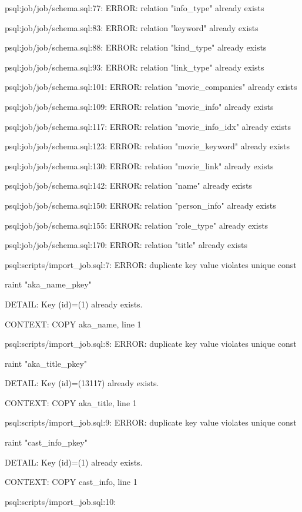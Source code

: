 \documentclass[11pt,a4paper]{article}
\begin{document}
psql:job/job/schema.sql:77: ERROR:  relation "info\_type" already exists

psql:job/job/schema.sql:83: ERROR:  relation "keyword" already exists

psql:job/job/schema.sql:88: ERROR:  relation "kind\_type" already exists

psql:job/job/schema.sql:93: ERROR:  relation "link\_type" already exists

psql:job/job/schema.sql:101: ERROR:  relation "movie\_companies" already exists

psql:job/job/schema.sql:109: ERROR:  relation "movie\_info" already exists

psql:job/job/schema.sql:117: ERROR:  relation "movie\_info\_idx" already exists

psql:job/job/schema.sql:123: ERROR:  relation "movie\_keyword" already exists

psql:job/job/schema.sql:130: ERROR:  relation "movie\_link" already exists

psql:job/job/schema.sql:142: ERROR:  relation "name" already exists

psql:job/job/schema.sql:150: ERROR:  relation "person\_info" already exists

psql:job/job/schema.sql:155: ERROR:  relation "role\_type" already exists

psql:job/job/schema.sql:170: ERROR:  relation "title" already exists

psql:scripts/import\_job.sql:7: ERROR:  duplicate key value violates unique const

raint "aka\_name\_pkey"

DETAIL:  Key (id)=(1) already exists.

CONTEXT:  COPY aka\_name, line 1

psql:scripts/import\_job.sql:8: ERROR:  duplicate key value violates unique const

raint "aka\_title\_pkey"

DETAIL:  Key (id)=(13117) already exists.

CONTEXT:  COPY aka\_title, line 1

psql:scripts/import\_job.sql:9: ERROR:  duplicate key value violates unique const

raint "cast\_info\_pkey"

DETAIL:  Key (id)=(1) already exists.

CONTEXT:  COPY cast\_info, line 1

psql:scripts/import\_job.sql:10:
\end{document}
